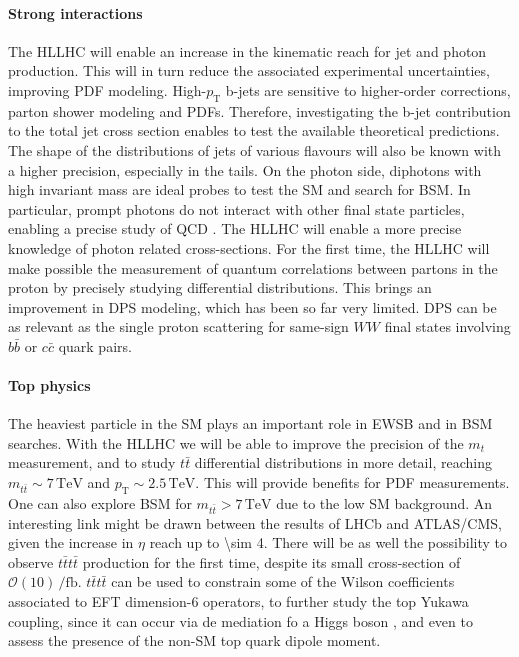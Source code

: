 \documentclass[11pt]{article}
\newcommand{\mt}{m_{t}}
\newcommand{\mtt}{m_{t\bar{t}}}
\newcommand{\pt}{p_{\text{T}}}
\begin{document}
\paragraph{Strong interactions}

The \ac{HLLHC} will enable an increase in the kinematic reach for jet and photon production.
This will in turn reduce the associated experimental uncertainties, improving \ac{PDF} modeling.
High-\(\pt\) b-jets are sensitive to higher-order corrections, parton shower modeling and \acp{PDF}.
Therefore, investigating the b-jet contribution to the total jet cross section enables to test the available theoretical predictions.
The shape of the distributions of jets of various flavours will also be known with a higher precision, especially in the tails.
On the photon side, diphotons with high invariant mass are ideal probes to test the \ac{SM} and search for \ac{BSM}. In particular, prompt photons do not interact with other final state particles, enabling a precise study of \ac{QCD} \cite{diphoton_cdf}.
The \ac{HLLHC} will enable a more precise knowledge of photon related cross-sections.
For the first time, the \ac{HLLHC} will make possible the measurement of quantum correlations between partons in the proton by precisely studying differential distributions.
This brings an improvement in \ac{DPS} modeling, which has been so far very limited.
\ac{DPS} can be as relevant as the single proton scattering for same-sign \(WW\) final states involving \(b\bar{b}\) or \(c\bar{c}\) quark pairs.

\paragraph{Top physics}
The heaviest particle in the \ac{SM} plays an important role in \ac{EWSB} and in \ac{BSM} searches.
With the \ac{HLLHC} we will be able to improve the precision of the \(\mt\) measurement, and to study \(t\bar{t}\) differential distributions in more detail, reaching \(\mtt\sim 7\,\si{\TeV}\) and \(\pt\sim 2.5\,\si{\TeV}\).
This will provide benefits for \ac{PDF} measurements.
One can also explore \ac{BSM} for \(\mtt > 7\,\si{\TeV}\) due to the low \ac{SM} background.
An interesting link might be drawn between the results of \ac{LHCb} and \ac{ATLAS}/\ac{CMS}, given the increase in \(\eta\) reach up to \num{\sim 4}.
There will be as well the possibility to observe \(t\bar{t}t\bar{t}\) production for the first time, despite its small cross-section of \(\mathcal{O}(10)\,\si{\per\femto\barn}\).
\(t\bar{t}t\bar{t}\) can be used to constrain some of the Wilson coefficients associated to \ac{EFT} dimension-6 operators, to further study the top Yukawa coupling, since it can occur via de mediation fo a Higgs boson \cite{tttt}, and even to assess the presence of the non-\ac{SM} top quark dipole moment.
\end{document}
